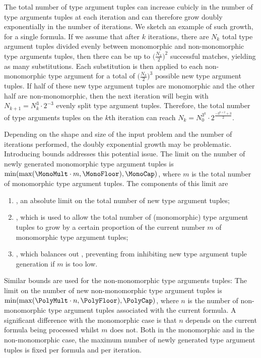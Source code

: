 \documentclass[runningheads]{llncs}
\begin{document}
The total number of type argument tuples can increase cubicly in the number of type arguments tuples at each iteration and can therefore grow doubly exponentially in the number of iterations. We sketch an example of such growth, for a single formula. If we assume that after \(k\) iterations, there are \(N_k\) total type argument tuples divided evenly between monomorphic and non-monomorphic type arguments tuples, then there can be up to \(\bigl(\frac{N_k}{2}\bigr)^2\) successful matches, yielding as many substitutions. Each substitution is then applied to each non-monomorphic type argument for a total of \(\bigl(\frac{N_k}{2}\bigr)^3\) possible new type argument tuples. If half of these new type argument tuples are monomorphic and the other half are non-monomorphic, then the next iteration will begin with \(N_{k+1} = N_k^3 \cdot 2^{-3}\) evenly split type argument tuples. Therefore, the total number of type arguments tuples on the \(k\)th iteration can reach \(N_k = N_0^{3^k} \cdot 2^{\frac{-3^{k+2}+3}{2}}\).

   Depending on the shape and size of the input problem and the number of iterations performed, the doubly exponential growth may be problematic. Introducing bounds addresses this potential issue. The limit on the number of newly generated monomorphic type argument tuples is \(\min(\max(\MonoMult\cdot m, \MonoFloor), \MonoCap)\), where \(m\) is the total number of monomorphic type argument tuples. The components of this limit are
\begin{enumerate}
   \item \MonoCap, an absolute limit on the total number of new type argument tuples;
   \item \MonoMult, which is used to allow the total number of (monomorphic) type argument tuples to grow by a certain proportion of the current number \(m\) of monomorphic type argument tuples;
   \item \MonoFloor, which balances out \MonoMult, preventing \MonoMult from inhibiting new type argument tuple generation if \(m\) is too low.
\end{enumerate}

Similar bounds are used for the non-monomorphic type arguments tuples:
The limit on the number of new non-monomorphic type argument tuples is \(\min(\max(\PolyMult\cdot n, \PolyFloor),\allowbreak \PolyCap)\), where \(n\) is the number of non-monomorphic type argument tuples associated with the current formula. A significant difference with the monomorphic case is that \(n\) depends on the current formula being processed whilst \(m\) does not.
Both in the monomorphic and in the non-monomorphic case, the maximum number of newly generated type argument tuples is fixed per formula and per iteration.
\end{document}
